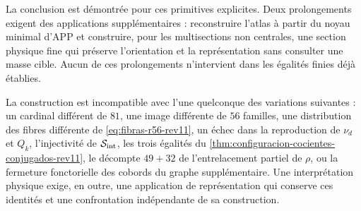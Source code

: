 La conclusion est démontrée pour ces primitives explicites. Deux
prolongements exigent des applications supplémentaires : reconstruire l'atlas à partir du
noyau minimal d'APP et construire, pour les multisections non centrales, une
section physique fine qui préserve l'orientation et la représentation sans consulter
une masse cible. Aucun de ces prolongements n'intervient dans les
égalités finies déjà établies.

La construction est incompatible avec l'une quelconque des
variations suivantes : un cardinal différent de \(81\), une image différente de \(56\)
familles, une distribution des fibres différente de
\eqref{eq:fibras-r56-rev11}, un échec dans la reproduction de
\(\nu_d\) et \(Q_k\), l'injectivité de
\(\mathcal S_{\rm int}\), les trois égalités du
\cref{thm:configuracion-cocientes-conjugados-rev11}, le décompte
\(49+32\) de l'entrelacement partiel de \(\rho\), ou la fermeture fonctorielle des
cobords du graphe supplémentaire. Une interprétation physique exige,
en outre, une application de représentation qui conserve ces identités et une
confrontation indépendante de sa construction.
